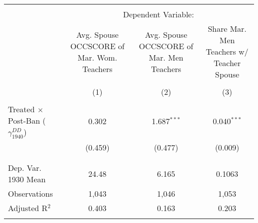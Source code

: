 
\begin{tabular}{@{\extracolsep{5pt}}lccc} 
\\[-1.8ex]\hline 
\hline \\[-1.8ex] 
 & \multicolumn{3}{c}{Dependent Variable:} \\ 
\cline{2-4} 
 & Avg. Spouse OCCSCORE of Mar. Wom. Teachers & Avg. Spouse OCCSCORE of Mar. Men Teachers & Share Mar. Men Teachers w/ Teacher Spouse \\ 
\\[-1.8ex] & (1) & (2) & (3)\\ 
\hline \\[-1.8ex] 
 Treated $\times$ Post-Ban ($\gamma_{1940}^{DD}$) & 0.302 & 1.687$^{***}$ & 0.040$^{***}$ \\ 
  & (0.459) & (0.477) & (0.009) \\ 
  & & & \\ 
\hline \\[-1.8ex] 
Dep. Var. 1930 Mean & 24.48 & 6.165 & 0.1063 \\ 
Observations & 1,043 & 1,046 & 1,053 \\ 
Adjusted R$^{2}$ & 0.403 & 0.163 & 0.203 \\ 
\hline 
\hline \\[-1.8ex] 
\end{tabular} 
